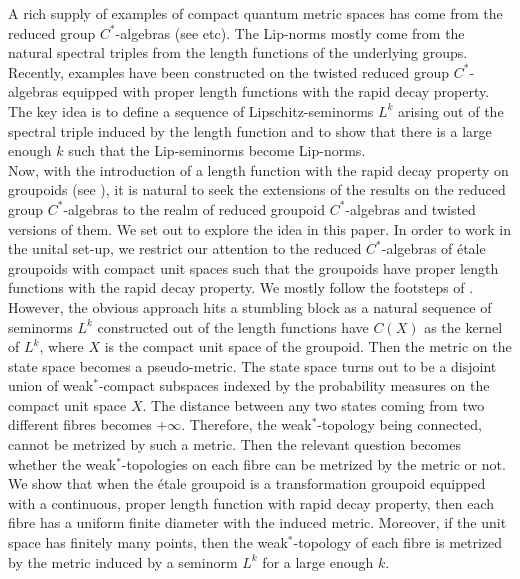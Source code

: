\documentclass[a4paper,11pt,reqno]{amsart}
\theoremstyle{plain}
\theoremstyle{named}
\numberwithin{equation}{section}
\begin{document}
			\indent A rich supply of examples of compact quantum metric spaces has come from the reduced group $C^{\ast}$-algebras (see \cite{Long-Wu-2017-Twisted-group-C-alg-as-CQMS, Rieffel-1998-Metrics-on-state-from-action-of-cmpt-gp, Ozawa_Rieffel_2005, Rieffel-2002-Group-C-alg-as-compact-quan-metr-sp} etc). The Lip-norms mostly come from the natural spectral triples from the length functions of the underlying groups. Recently, examples have been constructed on the twisted reduced group $C^{\ast}$-algebras equipped with proper length functions with the rapid decay property. The key idea is to define a sequence of Lipschitz-seminorms $L^{k}$ arising out of the spectral triple induced by the length function and to show that there is a large enough $k$ such that the Lip-seminorms become Lip-norms. \\
			\indent Now, with the introduction of a length function with the rapid decay property on groupoids (see \cite{Weygandt-2024-Rapid-decay-for-etale-gpd}), it is natural to seek the extensions of the results on the reduced group $C^{\ast}$-algebras to the realm of reduced groupoid $C^{\ast}$-algebras and twisted versions of them. We set out to explore the idea in this paper. In order to work in the unital set-up, we restrict our attention to the reduced $C^{\ast}$-algebras of étale groupoids with compact unit spaces such that the groupoids have proper length functions with the rapid decay property. We mostly follow the footsteps of \cite{Long-Wu-2017-Twisted-group-C-alg-as-CQMS, Rieffel-1998-Metrics-on-state-from-action-of-cmpt-gp}. However, the obvious approach hits a stumbling block as a natural sequence of seminorms $L^k$ constructed out of the length functions have $C(X)$ as the kernel of \(L^k\), where $X$ is the compact unit space of the groupoid. Then the metric on the state space becomes a pseudo-metric. The state space turns out to be a disjoint union of weak$^\ast$-compact subspaces indexed by the probability measures on the compact unit space $X$. The distance between any two states coming from two different fibres becomes $+\infty$. Therefore, the weak$^\ast$-topology being connected, cannot be metrized by such a metric. Then the relevant question becomes whether the weak$^\ast$-topologies on each fibre can be metrized by the metric or not. We show that when the étale groupoid is a transformation groupoid equipped with a continuous, proper length function with rapid decay property, then each fibre has a uniform finite diameter with the induced metric. Moreover, if the unit space has finitely many points, then the weak$^\ast$-topology of each fibre is metrized by the metric induced by a seminorm $L^k$ for a large enough $k$.
			
\end{document}

